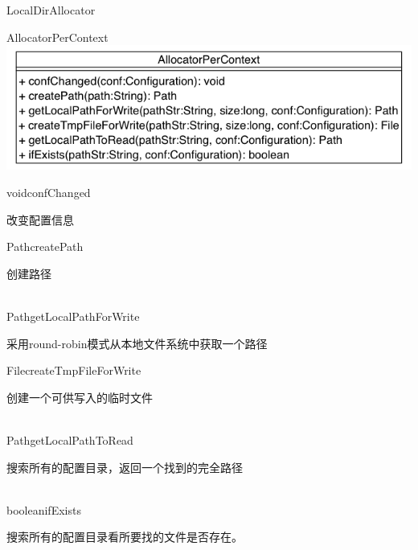 \begin{XeClass}{LocalDirAllocator}
    \begin{XeInnerClass}{AllocatorPerContext}
\includegraphics[width=\textwidth]{cdig/AllocatorPerContext.png}
        
        \begin{XeMethod}{\XePrivate}{void}{confChanged}
             
 改变配置信息

        \end{XeMethod}

        \begin{XeMethod}{\XePrivate}{Path}{createPath}
             
 创建路径

        \end{XeMethod}

        \begin{XeMethod}{\XePublic \\ \XeSync}{Path}{getLocalPathForWrite}
             
 采用round-robin模式从本地文件系统中获取一个路径

        \end{XeMethod}

        \begin{XeMethod}{\XePublic}{File}{createTmpFileForWrite}
             
 创建一个可供写入的临时文件

        \end{XeMethod}

        \begin{XeMethod}{\XePublic \\ \XeSync}{Path}{getLocalPathToRead}
             
 搜索所有的配置目录，返回一个找到的完全路径

        \end{XeMethod}

        \begin{XeMethod}{\XePublic \\ \XeSync}{boolean}{ifExists}
             
 搜索所有的配置目录看所要找的文件是否存在。

        \end{XeMethod}

    \end{XeInnerClass}
\end{XeClass}
